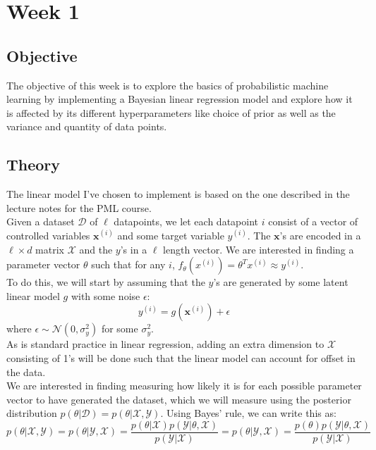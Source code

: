\section{Week 1}
\subsection{Objective}
The objective of this week is to explore the basics of probabilistic machine learning by implementing a Bayesian linear regression model 
and explore how it is affected by its different hyperparameters like choice of prior as well as the variance and quantity of data points.
\subsection{Theory}
The linear model I've chosen to implement is based on the one described in the lecture notes for the PML course.\\ 
Given a dataset $\mathcal{D}$ of $\ell$ datapoints, we let each datapoint $i$ consist of a vector of controlled variables $\mathbf{x}^{(i)}$ and some target variable $y^{(i)}$. The $\mathbf{x}$'s are encoded in a $\ell \times d$ matrix $\mathcal{X}$ and the $y$'s in a $\ell$ length vector.
We are interested in finding a parameter vector $\theta$ such that for any $i$, $f_\theta(x^{(i)}) = \theta^T x^{(i)} \approx y^{(i)}$.\\
To do this, we will start by assuming that the $y$'s are generated by some latent linear model $g$ with some noise $\epsilon$:
$$y^{(i)} = g(\mathbf{x}^{(i)}) + \epsilon$$
where $\epsilon \sim \mathcal{N}(0, \sigma^2_y)$ for some $\sigma^2_y$.\\
As is standard practice in linear regression, adding an extra dimension to $\mathcal{X}$ consisting of 1's will be done such that the linear model can account for offset in the data.\\
We are interested in finding measuring how likely it is for each possible parameter vector to have generated the dataset,
which we will measure using the posterior distribution $p(\theta | \mathcal{D}) = p(\theta | \mathcal{X}, \mathcal{Y})$.
Using Bayes' rule, we can write this as:
$$p(\theta | \mathcal{X}, \mathcal{Y}) = p(\theta | \mathcal{Y}, \mathcal{X}) = \frac{p(\theta|\mathcal{X}) p(\mathcal{Y}| \theta, \mathcal{X})}{p(\mathcal{Y}|\mathcal{X})} = p(\theta | \mathcal{Y}, \mathcal{X}) = \frac{p(\theta) p(\mathcal{Y}| \theta, \mathcal{X})}{p(\mathcal{Y}|\mathcal{X})}$$
